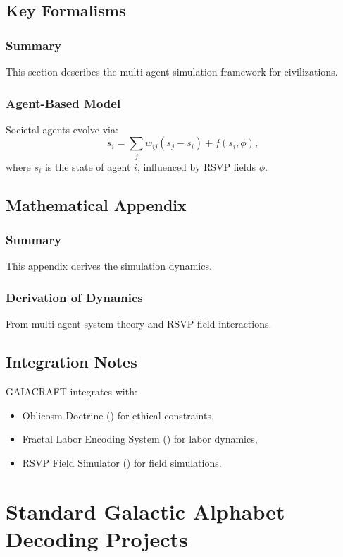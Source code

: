 \documentclass[11pt,oneside]{memoir}
\theoremstyle{plain}
\begin{document}
\section{Key Formalisms}
\subsection{Summary}
This section describes the multi-agent simulation framework for civilizations.

\subsection{Agent-Based Model}
Societal agents evolve via:
\begin{equation}
    \dot{s}_i = \sum_{j} w_{ij} (s_j - s_i) + f(s_i, \phi),
\end{equation}
where \(s_i\) is the state of agent \(i\), influenced by RSVP fields \(\phi\).

\section{Mathematical Appendix}
\subsection{Summary}
This appendix derives the simulation dynamics.

\subsection{Derivation of Dynamics}
From multi-agent system theory and RSVP field interactions.

\section{Integration Notes}
GAIACRAFT integrates with:
\begin{itemize}
    \item Oblicosm Doctrine () for ethical constraints,
    \item Fractal Labor Encoding System () for labor dynamics,
    \item RSVP Field Simulator () for field simulations.
\end{itemize}

\chapter{Standard Galactic Alphabet Decoding Projects}
\label{sec:sga_decoding}
\end{document}
